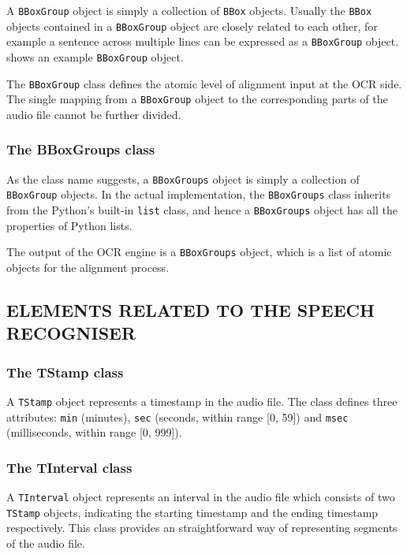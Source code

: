 \documentclass[12pt]{article}
\begin{document}
A \texttt{BBoxGroup} object is simply a collection of \texttt{BBox} objects. Usually the \texttt{BBox} objects contained in a \texttt{BBoxGroup} object are closely related to each other, for example a sentence across multiple lines can be expressed as a \texttt{BBoxGroup} object.  shows an example \texttt{BBoxGroup} object.

The \texttt{BBoxGroup} class defines the atomic level of alignment input at the OCR side. The single mapping from a \texttt{BBoxGroup} object to the corresponding parts of the audio file cannot be further divided.

\subsubsection{The BBoxGroups class}

As the class name suggests, a \texttt{BBoxGroups} object is simply a collection of \texttt{BBoxGroup} objects. In the actual implementation, the \texttt{BBoxGroups} class inherits from the Python's built-in \texttt{list} class, and hence a \texttt{BBoxGroups} object has all the properties of Python lists.

The output of the OCR engine is a \texttt{BBoxGroups} object, which is a list of atomic objects for the alignment process. 

\subsection{ELEMENTS RELATED TO THE SPEECH RECOGNISER}

\subsubsection{The TStamp class}

A \texttt{TStamp} object represents a timestamp in the audio file. The class defines three attributes: \texttt{min} (minutes), \texttt{sec} (seconds, within range [0, 59]) and \texttt{msec} (milliseconds, within range [0, 999]).

\subsubsection{The TInterval class}

A \texttt{TInterval} object represents an interval in the audio file which consists of two \texttt{TStamp} objects, indicating the starting timestamp and the ending timestamp respectively. This class provides an straightforward way of representing segments of the audio file.
\end{document}
